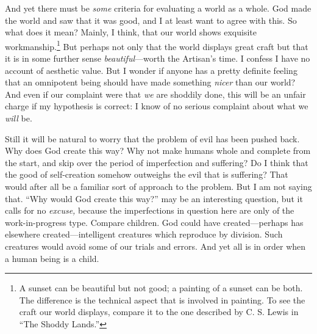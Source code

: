 \documentclass[11pt]{amsart}
\begin{document}
And yet there must be \emph{some} criteria for evaluating a world as a whole. God made the world and saw that it was good, and I at least want to agree with this. So what does it mean? Mainly, I think, that our world shows exquisite workmanship.\footnote{A sunset can be beautiful but not good; a painting of a sunset can be both. The difference is the technical aspect that is involved in painting. To see the craft our world displays, compare it to the one described by C. S. Lewis in ``The Shoddy Lands.''} But perhaps not only that the world displays great craft but that it is in some further sense \emph{beautiful}---worth the Artisan's time. I confess I have no account of aesthetic value. But I wonder if anyone has a pretty definite feeling that an omnipotent being should have made something \emph{nicer} than our world? And even if our complaint were that \emph{we} are shoddily done, this will be an unfair charge if my hypothesis is correct: I know of no serious complaint about what we \emph{will} be.



Still it will be natural to worry that the problem of evil has been pushed back. Why does God create this way? Why not make humans whole and complete from the start, and skip over the period of imperfection and suffering? Do I think that the good of self-creation somehow outweighs the evil that is suffering? That would after all be a familiar sort of approach to the problem. But I am not saying that. ``Why would God create this way?'' may be an interesting question, but it calls for no \emph{excuse,} because the imperfections in question here are only of the work-in-progress type. Compare children. God could have created---perhaps has elsewhere created---intelligent creatures which reproduce by division. Such creatures would avoid some of our trials and errors. And yet all is in order when a human being is a child.

\end{document}
